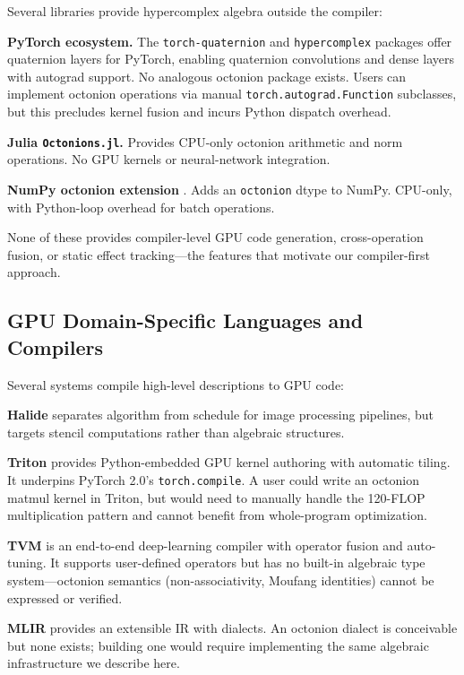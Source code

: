 \documentclass[11pt,a4paper]{article}
\begin{document}
Several libraries provide hypercomplex algebra outside the compiler:

\textbf{PyTorch ecosystem.} The \texttt{torch-quaternion} and \texttt{hypercomplex} packages offer quaternion layers for PyTorch, enabling quaternion convolutions and dense layers with autograd support. No analogous octonion package exists. Users can implement octonion operations via manual \texttt{torch.autograd.Function} subclasses, but this precludes kernel fusion and incurs Python dispatch overhead.

\textbf{Julia \texttt{Octonions.jl}.} Provides CPU-only octonion arithmetic and norm operations. No GPU kernels or neural-network integration.

\textbf{NumPy octonion extension} \cite{boyle2017}. Adds an \texttt{octonion} dtype to NumPy. CPU-only, with Python-loop overhead for batch operations.

None of these provides compiler-level GPU code generation, cross-operation fusion, or static effect tracking---the features that motivate our compiler-first approach.

\subsection{GPU Domain-Specific Languages and Compilers}

Several systems compile high-level descriptions to GPU code:

\textbf{Halide} \cite{ragankelley2013} separates algorithm from schedule for image processing pipelines, but targets stencil computations rather than algebraic structures.

\textbf{Triton} \cite{tillet2019} provides Python-embedded GPU kernel authoring with automatic tiling. It underpins PyTorch 2.0's \texttt{torch.compile}. A user could write an octonion matmul kernel in Triton, but would need to manually handle the 120-FLOP multiplication pattern and cannot benefit from whole-program optimization.

\textbf{TVM} \cite{chen2018tvm} is an end-to-end deep-learning compiler with operator fusion and auto-tuning. It supports user-defined operators but has no built-in algebraic type system---octonion semantics (non-associativity, Moufang identities) cannot be expressed or verified.

\textbf{MLIR} provides an extensible IR with dialects. An octonion dialect is conceivable but none exists; building one would require implementing the same algebraic infrastructure we describe here.
\end{document}
